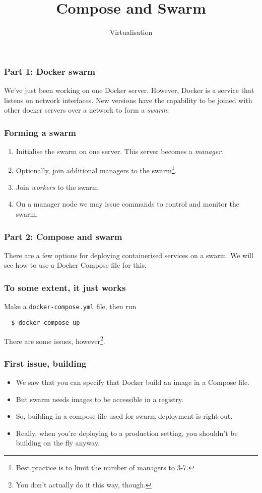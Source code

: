 \documentclass[10pt]{beamer}
\title{Compose and Swarm}
\author[I720]{Virtualisation}
\institute[Otago Polytechnic]{
  Otago Polytechnic \\
  Dunedin, New Zealand \\
}
\date{}
\begin{document}
\begin{frame}[plain]
  \titlepage
\end{frame}

\begin{frame}
  \frametitle{Part 1: Docker swarm}
  
  We've just been working on one Docker server. However, Docker is 
  a service that listens on network interfaces. New versions have the 
  capability to be joined with other docker servers over a network to
  form a \emph{swarm}.
\end{frame}

\begin{frame}
  \frametitle{Forming a swarm}
  
  \begin{enumerate}
    \item Initialise the swarm on one server. This server becomes a \emph{manager}.
    \item Optionally, join additional managers to the swarm\footnote{Best practice is to limit the number of managers to 3-7.}.
    \item Join \emph{workers} to the swarm.
    \item On a manager node we may issue commands to control and monitor the swarm.
  \end{enumerate}  
\end{frame}

\begin{frame}
  \frametitle{Part 2: Compose and swarm}
  
  There are a few options for deploying containerised services on a swarm.
  We will see how to use a Docker Compose file for this.
\end{frame}


\begin{frame}[fragile]
  \frametitle{To some extent, it just works}
  
  Make a \texttt{docker-compose.yml} file, then run
  
  \begin{verbatim}
  $ docker-compose up
   \end{verbatim}
   
   There are some issues, however\footnote{You don't actually do it this way, though.}.
\end{frame}

\begin{frame}
  \frametitle{First issue, building}
   
   \begin{itemize}
     \item We saw that you can specify that Docker build an image in a Compose file.
     \item But swarm needs images to be accessible in a registry.
     \item So, building in a compose file used for swarm deployment is right out.
     \item Really, when you're deploying to a production setting, you shouldn't be building on the fly anyway.
   \end{itemize}
\end{frame}
\end{document}
